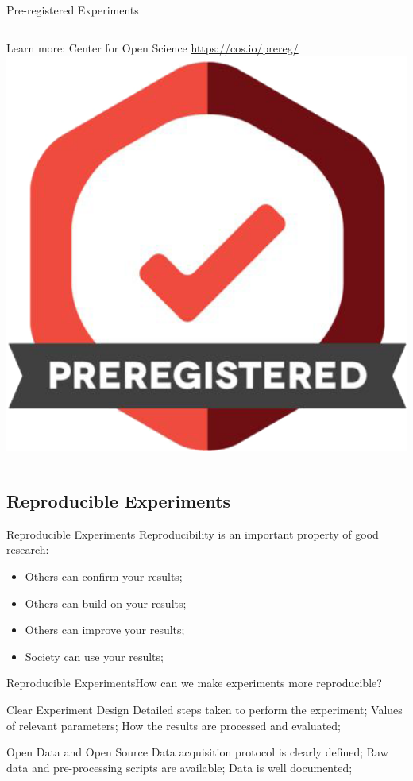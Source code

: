 \documentclass{beamer}
\begin{document}
\begin{CJK}{UTF8}{ipxm}
\begin{frame}{Pre-registered Experiments}
  \begin{columns}
    Learn more: Center for Open Science \url{https://cos.io/prereg/}
    \includegraphics[width=1\textwidth]{../img/prereg-badge}
  \end{columns}
\end{frame}

\subsection{Reproducible Experiments}
\begin{frame}{Reproducible Experiments}
  Reproducibility is an important property of good research:
  \bigskip

  \begin{itemize}
    \item Others can confirm your results;
      \medskip
    \item Others can build on your results;
      \medskip
    \item Others can improve your results;
      \medskip
    \item Society can use your results;
  \end{itemize}
\end{frame}

\begin{frame}{Reproducible Experiments}{How can we make experiments more reproducible?}
  \begin{exampleblock}{Clear Experiment Design}
    Detailed steps taken to perform the experiment; Values of relevant parameters; How the results are processed and evaluated;
  \end{exampleblock}
  \begin{exampleblock}{Open Data and Open Source}
    Data acquisition protocol is clearly defined; Raw data and pre-processing scripts are available; Data is well documented;\bigskip


\end{exampleblock}
\end{frame}
\end{CJK}
\end{document}
